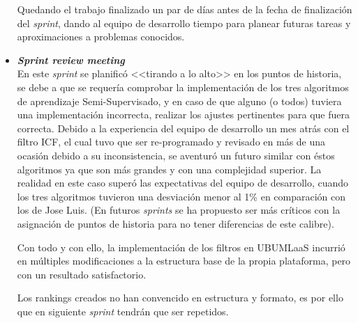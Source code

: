 \begin{itemize}
Quedando el trabajo finalizado un par de días antes de la fecha de finalización del \textit{sprint}, dando al equipo de desarrollo tiempo para planear futuras tareas y aproximaciones a problemas conocidos.

\item \textbf{\textit{Sprint review meeting}}\\
En este \textit{sprint} se planificó <<tirando a lo alto>> en los puntos de historia, se debe a que se requería comprobar la implementación de los tres algoritmos de aprendizaje Semi-Supervisado, y en caso de que alguno (o todos) tuviera una implementación incorrecta, realizar los ajustes pertinentes para que fuera correcta. Debido a la experiencia del equipo de desarrollo un mes atrás con el filtro ICF, el cual tuvo que ser re-programado y revisado en más de una ocasión debido a su inconsistencia, se aventuró un futuro similar con éstos algoritmos ya que son más grandes y con una complejidad superior. La realidad en este caso superó las expectativas del equipo de desarrollo, cuando los tres algoritmos tuvieron una desviación menor al 1\% en comparación con los de Jose Luis. (En futuros \textit{sprints} se ha propuesto ser más críticos con la asignación de puntos de historia para no tener diferencias de este calibre).

Con todo y con ello, la implementación de los filtros en UBUMLaaS incurrió en múltiples modificaciones a la estructura base de la propia plataforma, pero con un resultado satisfactorio.

Los rankings creados no han convencido en estructura y formato, es por ello que en siguiente \textit{sprint} tendrán que ser repetidos.
\end{itemize}

